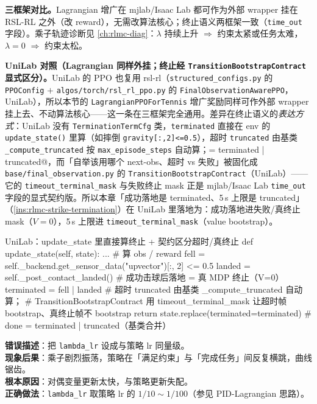 \textbf{三框架对比。}Lagrangian 增广在 mjlab/Isaac Lab 都可作为外部 wrapper 挂在 RSL-RL 之外（改 reward），无需改算法核心；终止语义两框架一致（\verb|time_out| 字段）。乘子轨迹诊断见 \cref{ch:rlmc-diag}：$\lambda$ 持续上升 $\Rightarrow$ 约束太紧或任务太难，$\lambda=0$ $\Rightarrow$ 约束太松。

\textbf{UniLab 对照（Lagrangian 同样外挂；终止经 \texttt{TransitionBootstrapContract} 显式区分）。}UniLab 的 PPO 也复用 rsl-rl（\verb|structured_configs.py| 的 \verb|PPOConfig| $+$ \verb|algos/torch/rsl_rl_ppo.py| 的 \verb|FinalObservationAwarePPO|，UniLab），所以本节的 \verb|LagrangianPPOForTennis| 增广奖励同样可作外部 wrapper 挂上去、不动算法核心——这一条在三框架完全通用。差异在终止语义的\emph{表达方式}：UniLab 没有 \verb|TerminationTermCfg| 类，\verb|terminated| 直接在 env 的 \verb|update_state()| 里算（如摔倒 \verb|gravity[:,2]<=0.5|），超时 \verb|truncated| 由基类 \verb|_compute_truncated| 按 \verb|max_episode_steps| 自动算；\verb@done = terminated | truncated@，而「自举该用哪个 next-obs、超时 vs 失败」被固化成 \verb|base/final_observation.py| 的 \verb|TransitionBootstrapContract|（UniLab）——它的 \verb|timeout_terminal_mask| 与失败终止 mask 正是 mjlab/Isaac Lab \verb|time_out| 字段的显式契约版。所以本章「成功落地是 terminated、5\,s 上限是 truncated」（\cref{ins:rlmc-strike-termination}）在 UniLab 里落地为：成功落地进失败/真终止 mask（$V=0$），5\,s 上限进 \verb|timeout_terminal_mask|（value bootstrap）。

\begin{codebox}[Python]{UniLab：update\_state 里直接算终止 + 契约区分超时/真终止}
def update_state(self, state):
    ...                                          # 算 obs / reward
    fell    = self._backend.get_sensor_data("upvector")[:, 2] <= 0.5
    landed  = self._post_contact_landed()        # 成功击球后落地 = 真 MDP 终止（V=0）
    terminated = fell | landed
    # 超时 truncated 由基类 _compute_truncated 自动算；
    # TransitionBootstrapContract 用 timeout_terminal_mask 让超时帧 bootstrap、真终止帧不 bootstrap
    return state.replace(terminated=terminated)  # done = terminated | truncated（基类合并）
\end{codebox}

\begin{pitfall}
\textbf{错误描述}：把 \verb|lambda_lr| 设成与策略 lr 同量级。\\
\textbf{现象后果}：乘子剧烈振荡，策略在「满足约束」与「完成任务」间反复横跳，曲线锯齿。\\
\textbf{根本原因}：对偶变量更新太快，与策略更新失配。\\
\textbf{正确做法}：\verb|lambda_lr| 取策略 lr 的 $1/10\sim1/100$（参见 PID-Lagrangian 思路）。
\end{pitfall}

